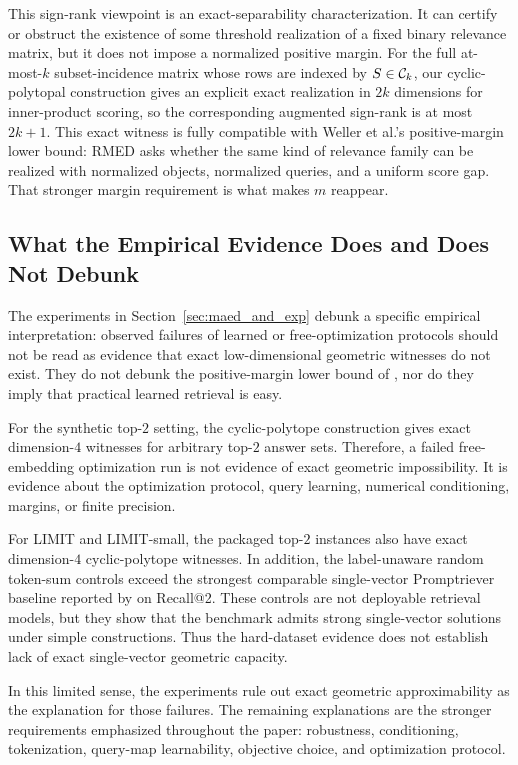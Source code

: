 \documentclass{article}
\begin{document}
This sign-rank viewpoint is an exact-separability characterization. It can certify or obstruct the existence of some threshold realization of a fixed binary relevance matrix, but it does not impose a normalized positive margin. For the full at-most-$k$ subset-incidence matrix whose rows are indexed by $S\in\mathcal{C}_k$, our cyclic-polytopal construction gives an explicit exact realization in $2k$ dimensions for inner-product scoring, so the corresponding augmented sign-rank is at most $2k+1$. This exact witness is fully compatible with Weller et al.'s positive-margin lower bound: RMED asks whether the same kind of relevance family can be realized with normalized objects, normalized queries, and a uniform score gap. That stronger margin requirement is what makes $m$ reappear.

\subsection{What the Empirical Evidence Does and Does Not Debunk}

The experiments in Section~\ref{sec:maed_and_exp} debunk a specific empirical interpretation: observed failures of learned or free-optimization protocols should not be read as evidence that exact low-dimensional geometric witnesses do not exist. They do not debunk the positive-margin lower bound of \citet{weller2025theoretical}, nor do they imply that practical learned retrieval is easy.

For the synthetic top-$2$ setting, the cyclic-polytope construction gives exact dimension-$4$ witnesses for arbitrary top-$2$ answer sets. Therefore, a failed free-embedding optimization run is not evidence of exact geometric impossibility. It is evidence about the optimization protocol, query learning, numerical conditioning, margins, or finite precision.

For LIMIT and LIMIT-small, the packaged top-$2$ instances also have exact dimension-$4$ cyclic-polytope witnesses. In addition, the label-unaware random token-sum controls exceed the strongest comparable single-vector Promptriever baseline reported by \citet{weller2025theoretical} on Recall@2. These controls are not deployable retrieval models, but they show that the benchmark admits strong single-vector solutions under simple constructions. Thus the hard-dataset evidence does not establish lack of exact single-vector geometric capacity.

In this limited sense, the experiments rule out exact geometric approximability as the explanation for those failures. The remaining explanations are the stronger requirements emphasized throughout the paper: robustness, conditioning, tokenization, query-map learnability, objective choice, and optimization protocol.
\end{document}
